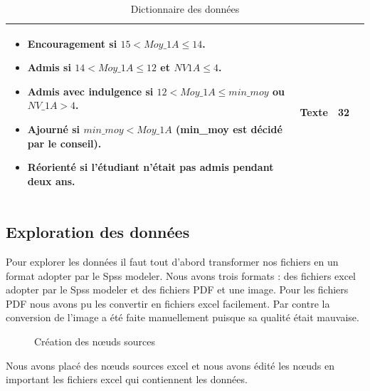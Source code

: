 \documentclass{article}
\begin{document}
\begin{table}
\begin{tabular}{|p{3cm}|p{6cm}|p{2cm}|p{2cm}|}
\begin{itemize}
                            \item Encouragement si $15<Moy\_1A\le14$.
                            \item Admis si $14<Moy\_1A\le12$ et $NV1A\le4$.
                            \item Admis avec indulgence si $12<Moy\_1A\le min\_moy$ ou $NV\_1A>4$.
                            \item Ajourné si $min\_moy<Moy\_1A$ (min\_moy est décidé par le conseil).
                            \item Réorienté si l’étudiant n’était pas admis pendant deux ans.
                        \end{itemize} & Texte & 32 \\ 
                        \hline
                    \end{tabular}
                    \caption{Dictionnaire des données}
                    \label{table:1}
                \end{table}
        \newpage
        \subsection{Exploration des données}
            Pour explorer les données il faut tout d’abord transformer nos fichiers en un format adopter par le Spss modeler. Nous avons trois formats : des fichiers excel adopter par le Spss modeler et des fichiers PDF et une image. Pour les fichiers PDF nous avons pu les convertir en fichiers excel facilement. Par contre la conversion de l’image a été faite manuellement puisque sa qualité était mauvaise.\par
            \begin{figure}[h!]
                \centering
                \caption{Création des nœuds sources}
                \label{fig:4}
            \end{figure}
            Nous avons placé des nœuds sources excel et nous avons édité les nœuds en important les fichiers excel qui contiennent les données. 
\end{document}
